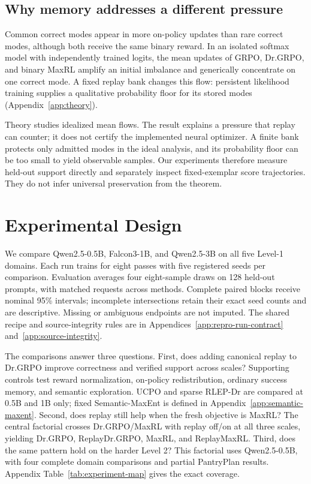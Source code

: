 \subsection{Why memory addresses a different pressure}
\label{sec:collapse-mechanism}

Common correct modes appear in more on-policy updates than rare correct modes,
although both receive the same binary reward. In an isolated softmax model
with independently trained logits, the mean updates of GRPO, Dr.GRPO, and
binary MaxRL amplify an initial imbalance and generically concentrate on one
correct mode. A fixed replay bank changes this flow: persistent likelihood
training supplies a qualitative probability floor for its stored modes
(Appendix~\ref{app:theory}).

Theory studies idealized mean flows. The result explains a pressure that replay
can counter; it does not certify the implemented neural optimizer. A finite
bank protects only admitted modes in the ideal analysis, and its probability
floor can be too small to yield observable samples. Our experiments therefore
measure held-out support directly and separately inspect fixed-exemplar score
trajectories. They do not infer universal preservation from the theorem.

\section{Experimental Design}
\label{sec:experiments}
\label{sec:shared-protocol}

We compare Qwen2.5-0.5B, Falcon3-1B, and Qwen2.5-3B on all five Level-1 domains.
Each run trains for eight passes with five registered seeds per comparison.
Evaluation averages four eight-sample draws on 128 held-out prompts, with
matched requests across methods. Complete paired blocks receive nominal
95\% intervals; incomplete intersections retain their exact seed counts and
are descriptive. Missing or ambiguous endpoints are not imputed. The shared
recipe and source-integrity rules are in
Appendices~\ref{app:repro-run-contract} and~\ref{app:source-integrity}.

\label{sec:retention-design}
The comparisons answer three questions. First, does adding canonical replay
to Dr.GRPO improve correctness and verified support across scales? Supporting
controls test reward normalization, on-policy redistribution, ordinary success
memory, and semantic exploration. UCPO and sparse RLEP-Dr are compared at
0.5B and 1B only; fixed Semantic-MaxEnt is defined in
Appendix~\ref{app:semantic-maxent}. Second, does replay still help when the
fresh objective is MaxRL?
\label{sec:factorial-design}
The central factorial crosses Dr.GRPO/MaxRL with replay off/on at all three
scales, yielding Dr.GRPO, ReplayDr.GRPO, MaxRL, and ReplayMaxRL.
Third, does the same pattern hold on the harder Level 2? This factorial uses
Qwen2.5-0.5B, with four complete domain comparisons and partial PantryPlan
results. Appendix Table~\ref{tab:experiment-map} gives the exact coverage.

